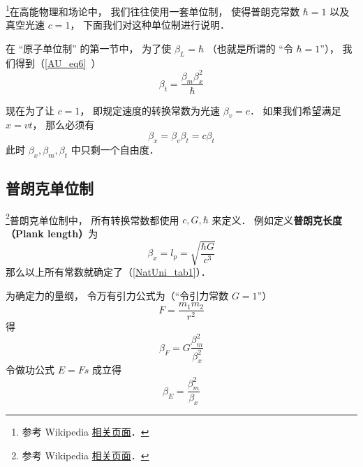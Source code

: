 
\begin{issues}
\issueDraft
\end{issues}


\footnote{参考 Wikipedia \href{https://en.wikipedia.org/wiki/Natural_units}{相关页面}．}在高能物理和场论中， 我们往往使用一套单位制， 使得普朗克常数 $\hbar = 1$ 以及真空光速 $c = 1$， 下面我们对这种单位制进行说明．

在 “原子单位制” 的第一节中， 为了使 $\beta_L = \hbar$ （也就是所谓的 “令 $\hbar = 1$”）， 我们得到（\autoref{AU_eq6}~）
\begin{equation}\label{NatUni_eq1}
\beta_t = \frac{\beta_m \beta_x^2}{\hbar}
\end{equation}

现在为了让 $c = 1$， 即规定速度的转换常数为光速 $\beta_v = c$． 如果我们希望满足 $x = vt$， 那么必须有
\begin{equation}
\beta_x = \beta_v \beta _t = c\beta_t
\end{equation}
此时 $\beta_x, \beta_m, \beta_t$ 中只剩一个自由度．

\subsection{普朗克单位制}
\footnote{参考 Wikipedia \href{https://en.wikipedia.org/wiki/Planck_units}{相关页面}．}普朗克单位制中， 所有转换常数都使用 $c, G, \hbar$ 来定义． 例如定义\textbf{普朗克长度（Plank length）}为
\begin{equation}
\beta_x = l_p = \sqrt{\frac{\hbar G}{c^3}}
\end{equation}
那么以上所有常数就确定了（\autoref{NatUni_tab1}）．

为确定力的量纲， 令万有引力公式为（“令引力常数 $G = 1$”）
\begin{equation}
F = \frac{m_1 m_2}{r^2}
\end{equation}
得
\begin{equation}
\beta_F = G\frac{\beta_m^2}{\beta_x^2}
\end{equation}
令做功公式 $E = Fs$ 成立得
\begin{equation}
\beta_E = \frac{\beta_m^2}{\beta_x}
\end{equation}


